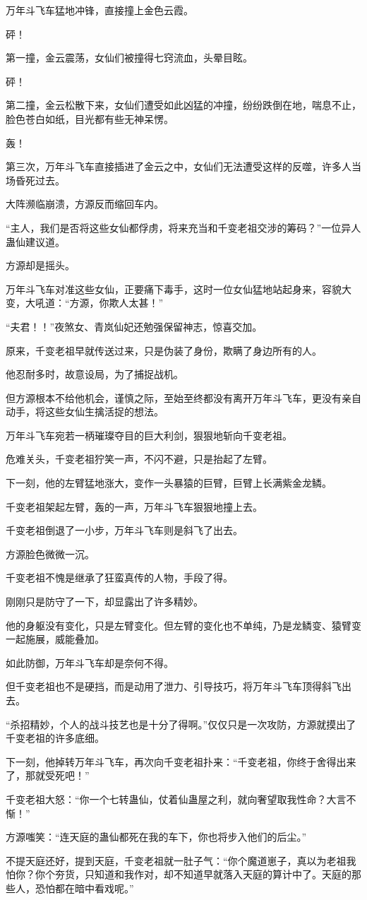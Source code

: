 \begin{this_body}
万年斗飞车猛地冲锋，直接撞上金色云霞。

砰！

第一撞，金云震荡，女仙们被撞得七窍流血，头晕目眩。

砰！

第二撞，金云松散下来，女仙们遭受如此凶猛的冲撞，纷纷跌倒在地，喘息不止，脸色苍白如纸，目光都有些无神呆愣。

轰！

第三次，万年斗飞车直接插进了金云之中，女仙们无法遭受这样的反噬，许多人当场昏死过去。

大阵濒临崩溃，方源反而缩回车内。

“主人，我们是否将这些女仙都俘虏，将来充当和千变老祖交涉的筹码？”一位异人蛊仙建议道。

方源却是摇头。

万年斗飞车对准这些女仙，正要痛下毒手，这时一位女仙猛地站起身来，容貌大变，大吼道：“方源，你欺人太甚！”

“夫君！！”夜煞女、青岚仙妃还勉强保留神志，惊喜交加。

原来，千变老祖早就传送过来，只是伪装了身份，欺瞒了身边所有的人。

他忍耐多时，故意设局，为了捕捉战机。

但方源根本不给他机会，谨慎之际，至始至终都没有离开万年斗飞车，更没有亲自动手，将这些女仙生擒活捉的想法。

万年斗飞车宛若一柄璀璨夺目的巨大利剑，狠狠地斩向千变老祖。

危难关头，千变老祖狞笑一声，不闪不避，只是抬起了左臂。

下一刻，他的左臂猛地涨大，变作一头暴猿的巨臂，巨臂上长满紫金龙鳞。

千变老祖架起左臂，轰的一声，万年斗飞车狠狠地撞上去。

千变老祖倒退了一小步，万年斗飞车则是斜飞了出去。

方源脸色微微一沉。

千变老祖不愧是继承了狂蛮真传的人物，手段了得。

刚刚只是防守了一下，却显露出了许多精妙。

他的身躯没有变化，只是左臂变化。但左臂的变化也不单纯，乃是龙鳞变、猿臂变一起施展，威能叠加。

如此防御，万年斗飞车却是奈何不得。

但千变老祖也不是硬挡，而是动用了泄力、引导技巧，将万年斗飞车顶得斜飞出去。

“杀招精妙，个人的战斗技艺也是十分了得啊。”仅仅只是一次攻防，方源就摸出了千变老祖的许多底细。

下一刻，他掉转万年斗飞车，再次向千变老祖扑来：“千变老祖，你终于舍得出来了，那就受死吧！”

千变老祖大怒：“你一个七转蛊仙，仗着仙蛊屋之利，就向奢望取我性命？大言不惭！”

方源嗤笑：“连天庭的蛊仙都死在我的车下，你也将步入他们的后尘。”

不提天庭还好，提到天庭，千变老祖就一肚子气：“你个魔道崽子，真以为老祖我怕你？你个夯货，只知道和我作对，却不知道早就落入天庭的算计中了。天庭的那些人，恐怕都在暗中看戏呢。”

\end{this_body}

